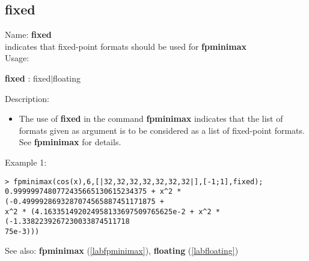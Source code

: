 \subsection{fixed}
\label{labfixed}
\noindent Name: \textbf{fixed}\\
indicates that fixed-point formats should be used for \textbf{fpminimax}\\
\noindent Usage: 
\begin{center}
\textbf{fixed} : \textsf{fixed$|$floating}
\\ 
\end{center}
\noindent Description: \begin{itemize}

\item The use of \textbf{fixed} in the command \textbf{fpminimax} indicates that the list of
   formats given as argument is to be considered as a list of fixed-point
   formats.
   See \textbf{fpminimax} for details.
\end{itemize}
\noindent Example 1: 
\begin{center}\begin{minipage}{15cm}\begin{Verbatim}[frame=single]
> fpminimax(cos(x),6,[|32,32,32,32,32,32,32|],[-1;1],fixed);
0.9999997480772435665130615234375 + x^2 * (-0.4999928693287074565887451171875 + 
x^2 * (4.163351492024958133697509765625e-2 + x^2 * (-1.3382239267230033874511718
75e-3)))
\end{Verbatim}
\end{minipage}\end{center}
See also: \textbf{fpminimax} (\ref{labfpminimax}), \textbf{floating} (\ref{labfloating})
